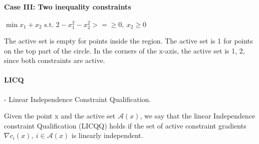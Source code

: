\documentclass{article}
\begin{document}
\paragraph{Case III: Two inequality constraints} $\min x_1 + x_2 \text{ s.t. } 2 - x_1^2 -x_2^2 >= \geq 0,\ x_2 \geq 0$

\begin{minipage}[c]{0.5\textwidth}
\end{minipage}
\begin{minipage}[c]{0.5\textwidth}
  The active set is empty for points inside the region. The active set is {1} for points on the top
  part of the circle. In the corners of the x-axis, the active set is {1, 2}, since both constraints are
  active. 
\end{minipage}

\paragraph{LICQ} - Linear Independence Constraint Qualification.

Given the point x and the active set $\mathcal{A}(x)$, we say that the linear Independence constraint Qualification
(LICQQ) holds if the set of active constraint gradients ${\nabla c_i(x),\  i\in \mathcal{A}(x)}$ is linearly independent.
\end{document}
